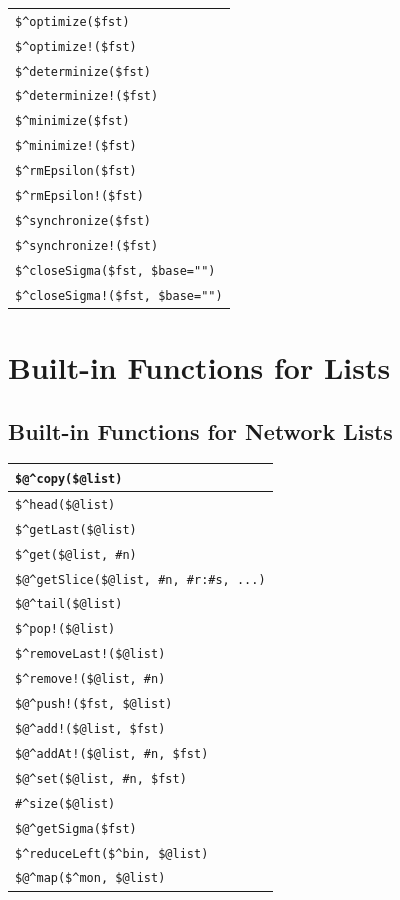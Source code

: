 \documentclass[letterpaper,12pt]{article}
\begin{document}
\begin{tabular}{|l|}
\hline
\verb!$^optimize($fst)! \\
\verb/$^optimize!($fst)/ \\
\verb!$^determinize($fst)! \\
\verb/$^determinize!($fst)/ \\
\verb!$^minimize($fst)! \\
\verb/$^minimize!($fst)/ \\
\verb!$^rmEpsilon($fst)! \\
\verb/$^rmEpsilon!($fst)/ \\
\verb!$^synchronize($fst)! \\
\verb/$^synchronize!($fst)/ \\
\hline
\verb/$^closeSigma($fst, $base="")/\\
\verb/$^closeSigma!($fst, $base="")/\\
\hline
\end{tabular}

\newpage

\section{Built-in Functions for Lists}

\subsection{Built-in Functions for Network Lists}

\begin{tabular}{|l|}
\hline
\verb!$@^copy($@list)! \\
\hline
\verb!$^head($@list)! \\
\verb!$^getLast($@list)! \\
\verb!$^get($@list, #n)! \\
\verb!$@^getSlice($@list, #n, #r:#s, ...)! \\
\verb!$@^tail($@list)! \\
\hline
\verb+$^pop!($@list)+ \\
\verb+$^removeLast!($@list)+ \\
\verb+$^remove!($@list, #n)+ \\
\hline
\verb+$@^push!($fst, $@list)+ \\
\verb+$@^add!($@list, $fst)+ \\
\verb+$@^addAt!($@list, #n, $fst)+ \\
\hline
\verb!$@^set($@list, #n, $fst)! \\
\hline
\verb!#^size($@list)! \\
\verb!$@^getSigma($fst)! \\
\hline
\verb!$^reduceLeft($^bin, $@list)! \\
\hline
\verb!$@^map($^mon, $@list)! \\
\hline
\end{tabular}
\end{document}
